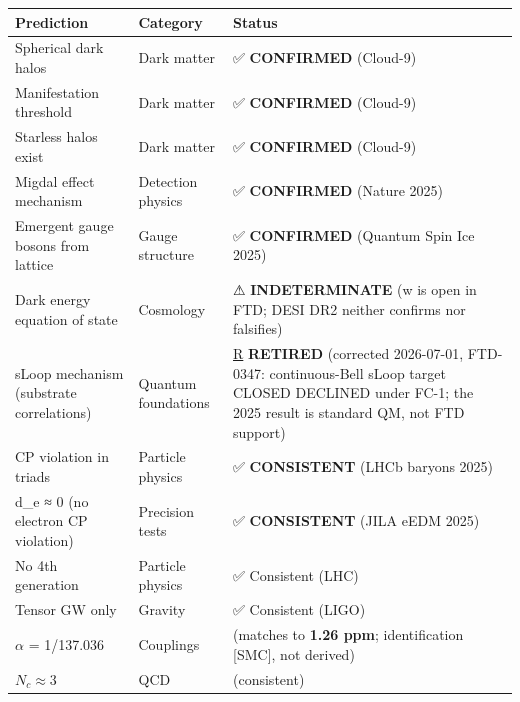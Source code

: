 \documentclass[
  11pt,
  letterpaper,
  twoside,
  openright]{book}
\begin{document}
\begin{longtable}[]{@{}
  >{\raggedright\arraybackslash}p{}
  >{\raggedright\arraybackslash}p{}
  >{\raggedright\arraybackslash}p{}@{}}
\toprule\noalign{}
\begin{minipage}[b]{\linewidth}\raggedright
Prediction
\end{minipage} & \begin{minipage}[b]{\linewidth}\raggedright
Category
\end{minipage} & \begin{minipage}[b]{\linewidth}\raggedright
Status
\end{minipage} \\
\midrule\noalign{}
\endhead
\bottomrule\noalign{}
\endlastfoot
Spherical dark halos & Dark matter & ✅ \textbf{CONFIRMED} (Cloud-9) \\
Manifestation threshold & Dark matter & ✅ \textbf{CONFIRMED}
(Cloud-9) \\
Starless halos exist & Dark matter & ✅ \textbf{CONFIRMED} (Cloud-9) \\
Migdal effect mechanism & Detection physics & ✅ \textbf{CONFIRMED}
(Nature 2025) \\
Emergent gauge bosons from lattice & Gauge structure & ✅
\textbf{CONFIRMED} (Quantum Spin Ice 2025) \\
Dark energy equation of state & Cosmology & ⚠ \textbf{INDETERMINATE} (w
is open in FTD; DESI DR2 neither confirms nor falsifies) \\
sLoop mechanism (substrate correlations) & Quantum foundations &
\hyperref[r]{R} \textbf{RETIRED} (corrected 2026-07-01, FTD-0347:
continuous-Bell sLoop target CLOSED DECLINED under FC-1; the 2025 result
is standard QM, not FTD support) \\
CP violation in triads & Particle physics & ✅ \textbf{CONSISTENT} (LHCb
baryons 2025) \\
d\_e ≈ 0 (no electron CP violation) & Precision tests & ✅
\textbf{CONSISTENT} (JILA eEDM 2025) \\
No 4th generation & Particle physics & ✅ Consistent (LHC) \\
Tensor GW only & Gravity & ✅ Consistent (LIGO) \\
\(\alpha\) = 1/137.036 & Couplings & (matches to \textbf{1.26 ppm};
identification {[}SMC{]}, not derived) \\
\(N_c \approx 3\) & QCD & (consistent) \\
\end{longtable}
\end{document}
